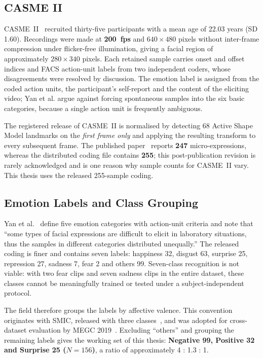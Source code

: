 \subsection{CASME II}
\label{sec:casme2-construction}

CASME~II~\cite{yan2014} recruited thirty-five participants with a mean age of 22.03 years (SD 1.60). Recordings were made at \textbf{200~fps} and $640\times480$ pixels without inter-frame compression under flicker-free illumination, giving a facial region of approximately $280\times340$ pixels. Each retained sample carries onset and offset indices and FACS action-unit labels from two independent coders, whose disagreements were resolved by discussion. The emotion label is assigned from the coded action units, the participant's self-report and the content of the eliciting video; Yan et al. argue against forcing spontaneous samples into the six basic categories, because a single action unit is frequently ambiguous.

The registered release of CASME~II is normalised by detecting 68 Active Shape Model landmarks on the \textit{first frame only} and applying the resulting transform to every subsequent frame. The published paper~\cite{yan2014} reports \textbf{247} micro-expressions, whereas the distributed coding file contains \textbf{255}; this post-publication revision is rarely acknowledged and is one reason why sample counts for CASME~II vary. This thesis uses the released 255-sample coding.

\subsection{Emotion Labels and Class Grouping}
\label{sec:label-taxonomy}

Yan et al.~\cite{yan2014} define five emotion categories with action-unit criteria and note that ``some types of facial expressions are difficult to elicit in laboratory situations, thus the samples in different categories distributed unequally.'' The released coding is finer and contains seven labels: happiness 32, disgust 63, surprise 25, repression 27, sadness 7, fear 2 and others 99. Seven-class recognition is not viable: with two fear clips and seven sadness clips in the entire dataset, these classes cannot be meaningfully trained or tested under a subject-independent protocol.

The field therefore groups the labels by affective valence. This convention originates with SMIC, released with three classes~\cite{liX2013}, and was adopted for cross-dataset evaluation by MEGC 2019~\cite{see2019}. Excluding ``others'' and grouping the remaining labels gives the working set of this thesis: \textbf{Negative 99, Positive 32 and Surprise 25 ($N = 156$)}, a ratio of approximately 4 : 1.3 : 1.

